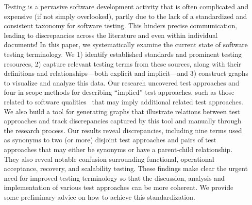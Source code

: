 \label{abstract}%
Testing is a pervasive software development activity that is often
complicated and expensive (if not simply overlooked), partly due to
the lack of a standardized and consistent taxonomy for software testing.
This hinders precise communication, leading to discrepancies across the
literature and even within individual documents!
In this paper, we systematically examine the current state of software
testing terminology. We 1) identify established standards
and prominent testing resources, 2) capture relevant testing terms
from these sources, along with their definitions and relationships---both
explicit and implicit---and 3) construct graphs to visualize and analyze
this data. Our research uncovered \approachCount{} test approaches and
\ifnotpaper four in-scope methods for describing ``implied'' test approaches,
    such as those related to \fi \qualityCount{} software qualities\ifnotpaper%
\else\ that may imply additional related test approaches\fi. We also build
a tool for generating graphs that illustrate relations between test
approaches and track discrepancies captured by this tool and manually through
the research process. Our results reveal \totalDiscreps{} discrepancies,
including nine terms used as synonyms to two (or more) disjoint test approaches
and \parSynCount{} pairs of test approaches that may
either be synonyms or have a parent-child relationship. They also reveal
notable confusion surrounding functional, operational acceptance, recovery,
and scalability testing. These findings make clear
the urgent need for improved testing terminology so that the discussion,
analysis and implementation of various test approaches can be more coherent.
We provide some preliminary advice on how to achieve this standardization.